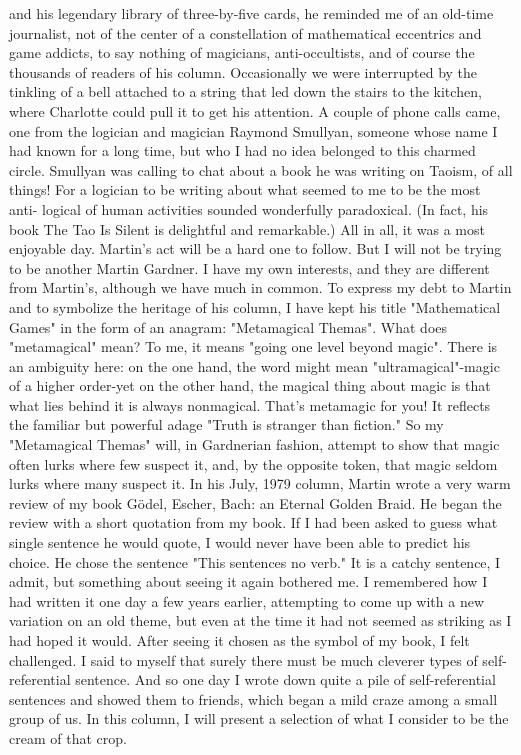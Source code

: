 and his legendary library of three-by-five cards, he reminded me of an old-time journalist, not of the center of a constellation of mathematical eccentrics and game addicts, to say nothing of magicians, anti-occultists, and of course the thousands of readers of his column. Occasionally we were interrupted by the tinkling of a bell attached to a string that led down the stairs to the kitchen, where Charlotte could pull it to get his attention. A couple of phone calls came, one from the logician and magician Raymond Smullyan, someone whose name I had known for a long time, but who I had no idea belonged to this charmed circle. Smullyan was calling to chat about a book he was writing on Taoism, of all things! For a logician to be writing about what seemed to me to be the most anti- logical of human activities sounded wonderfully paradoxical. (In fact, his book The Tao Is Silent is delightful and remarkable.) All in all, it was a most enjoyable day. Martin's act will be a hard one to follow. But I will not be trying to be another Martin Gardner. I have my own interests, and they are different from Martin's, although we have much in common. To express my debt to Martin and to symbolize the heritage of his column, I have kept his title "Mathematical Games" in the form of an anagram: "Metamagical Themas". What does "metamagical" mean? To me, it means "going one level beyond magic". There is an ambiguity here: on the one hand, the word might mean "ultramagical"-magic of a higher order-yet on the other hand, the magical thing about magic is that what lies behind it is always nonmagical. That's metamagic for you! It reflects the familiar but powerful adage "Truth is stranger than fiction." So my "Metamagical Themas" will, in Gardnerian fashion, attempt to show that magic often lurks where few suspect it, and, by the opposite token, that magic seldom lurks where many suspect it. 
\separator
In his July, 1979 column, Martin wrote a very warm review of my book Gödel, Escher, Bach: an Eternal Golden Braid. He began the review with a short quotation from my book. If I had been asked to guess what single sentence he would quote, I would never have been able to predict his choice. He chose the sentence "This sentences no verb." It is a catchy sentence, I admit, but something about seeing it again bothered me. I remembered how I had written it one day a few years earlier, attempting to come up with a new variation on an old theme, but even at the time it had not seemed as striking as I had hoped it would. After seeing it chosen as the symbol of my book, I felt challenged. I said to myself that surely there must be much cleverer types of self-referential sentence. And so one day I wrote down quite a pile of self-referential sentences and showed them to friends, which began a mild craze among a small group of us. In this column, I will present a selection of what I consider to be the cream of that crop. 



